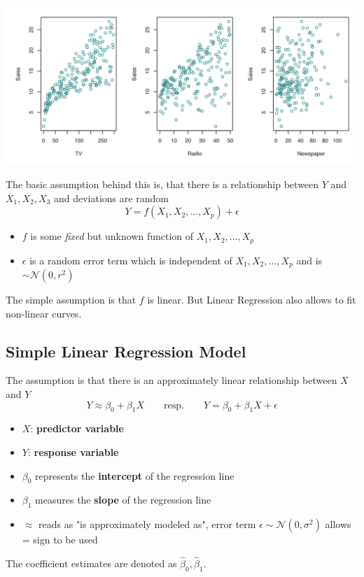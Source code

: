 \documentclass[11pt]{article}
\newcommand*\N[1]{\mathcal{N}\left(#1\right)}
\begin{document}
\begin{center}
	\includegraphics[width=0.8\linewidth]{img/sales_advertising}
\end{center}

The basic assumption behind this is, that there is a relationship between $Y$ and $X_1, X_2, X_3$ and deviations are random
\begin{equation*}
	Y = f(X_1, X_2,\dots, X_p) + \epsilon
\end{equation*}
\begin{itemize}
	\item $f$ is some \emph{fixed} but unknown function of $X_1, X_2,\dots, X_p$
	\item $\epsilon$ is a random error term which is independent of $X_1, X_2,\dots, X_p$ and is $\sim\N{0,r^2}$
\end{itemize}
The simple assumption is that $f$ is linear. But Linear Regression also allows to fit non-linear curves.

\subsection{Simple Linear Regression Model}
The assumption is that there is an approximately linear relationship between $X$ and $Y$
\begin{equation*}
	Y \approx \beta_0 + \beta_1 X \qquad \text{resp.} \qquad Y = \beta_0 + \beta_1 X + \epsilon
\end{equation*}
\begin{itemize}[noitemsep]
	\item $X$: \textbf{predictor variable}
	\item $Y$: \textbf{response variable}
	\item $\beta_0$ represents the \textbf{intercept} of the regression line
	\item $\beta_1$ measures the \textbf{slope} of the regression line
	\item $\approx$ reads as "is approximately modeled as", error term $\epsilon \sim \N{0, \sigma^2}$ allows = sign to be used
\end{itemize}
The coefficient estimates are denoted as $\hat{\beta}_0, \hat{\beta}_1$.
\end{document}
